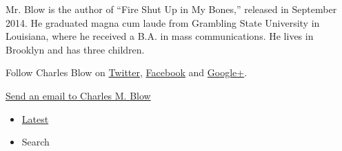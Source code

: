 Mr. Blow is the author of ``Fire Shut Up in My Bones,'' released in
September 2014. He graduated magna cum laude from Grambling State
University in Louisiana, where he received a B.A. in mass
communications. He lives in Brooklyn and has three children.

Follow Charles Blow on \href{https://twitter.com/charlesmblow}{Twitter},
\href{https://www.facebook.com/CharlesMBlow}{Facebook} and
\href{https://plus.google.com/+CharlesBlow/posts}{Google+}.

\href{javascript:document.emailUsReporter.submit()}{Send an email to
Charles M. Blow}

\begin{itemize}
\tightlist
\item
  \protect\hyperlink{stream-panel}{Latest}
\item
  Search
\end{itemize}

